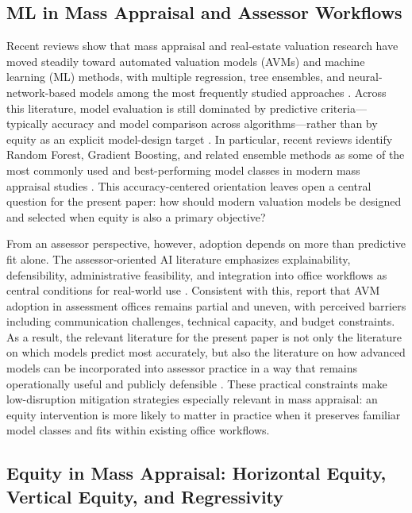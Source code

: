 \documentclass[12pt, draft]{article}
\theoremstyle{plain}
\theoremstyle{definition}
\newcommand{\1}{\mathbf{1}}
\begin{document}
\subsection{ML in Mass Appraisal and Assessor Workflows}

Recent reviews show that mass appraisal and real-estate valuation research have moved steadily toward automated valuation models (AVMs) and machine learning (ML) methods, with multiple regression, tree ensembles, and neural-network-based models among the most frequently studied approaches \cite{WangLi2019,Rootetal2023,Zilli2024,purdueAssessingTechniques}. Across this literature, model evaluation is still dominated by predictive criteria---typically accuracy and model comparison across algorithms---rather than by equity as an explicit model-design target \cite{WangLi2019,Rootetal2023,Zilli2024}. In particular, recent reviews identify Random Forest, Gradient Boosting, and related ensemble methods as some of the most commonly used and best-performing model classes in modern mass appraisal studies \cite{Rootetal2023,Sevgen2024100111,Zilli2024}. This accuracy-centered orientation leaves open a central question for the present paper: how should modern valuation models be designed and selected when equity is also a primary objective?

From an assessor perspective, however, adoption depends on more than predictive fit alone. The assessor-oriented AI literature emphasizes explainability, defensibility, administrative feasibility, and integration into office workflows as central conditions for real-world use \cite{IAAOAITaskForce2022}. Consistent with this, \textcite{BidansetRakow2022} report that AVM adoption in assessment offices remains partial and uneven, with perceived barriers including communication challenges, technical capacity, and budget constraints. As a result, the relevant literature for the present paper is not only the literature on which models predict most accurately, but also the literature on how advanced models can be incorporated into assessor practice in a way that remains operationally useful and publicly defensible \cite{IAAOAITaskForce2022,BidansetRakow2022}. These practical constraints make low-disruption mitigation strategies especially relevant in mass appraisal: an equity intervention is more likely to matter in practice when it preserves familiar model classes and fits within existing office workflows.





\subsection{Equity in Mass Appraisal: Horizontal Equity, Vertical Equity, and Regressivity}
\end{document}
